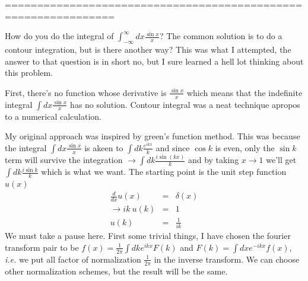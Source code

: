 \documentclass[aps,preprint,preprintnumbers,nofootinbib,showpacs,prd]{revtex4-1}
\newcommand{\ie}{{\it i.e.} }
\newcommand{\nbea}{\begin{eqnarray*}}
\newcommand{\neea}{\end{eqnarray*}}
\begin{document}
===============================================================

How do you do the integral of $\int_{-\infty}^{\infty} dx \frac{\sin x}{x}$? The common solution is to do a contour integration, but is there another way? This was what I attempted, the answer to that question is in short no, but I sure learned a hell lot thinking about this problem.

First, there's no function whose derivative is $\frac{\sin x}{x}$ which means that the indefinite integral $\int dx \frac{\sin x}{x}$ has no solution. Contour integral was a neat technique apropos to a numerical calculation.

My original approach was inspired by green's function method. This was because the integral $\int dx \frac{\sin x}{x}$ is akeen to $\int dk \frac {e^{ikx}}{k}$ and since $\cos k$ is even, only the $\sin k$ term will survive the integration $\rightarrow \int dk \frac {i\sin (kx)}{k}$ and by taking $x \rightarrow 1$ we'll get $\int dk \frac{i \sin k}{k}$ which is what we want. The starting point is the unit step function $u(x)$
%
\nbea
\frac{d}{dx} u(x) & = & \delta(x) \\
\rightarrow ik ~ u(k) & = & 1 \\
u(k) & = & \frac{1}{ik}
\neea
%
We must take a pause here. First some trivial things, I have chosen the fourier transform pair to be $f(x) = \frac{1}{2\pi} \int dk e^{ikx} F(k)$ and $F(k) = \int dx e^{-ikx} f(x)$, \ie we put all factor of normalization $\frac{1}{2\pi}$ in the inverse transform. We can choose other normalization schemes, but the result will be the same.
\end{document}
